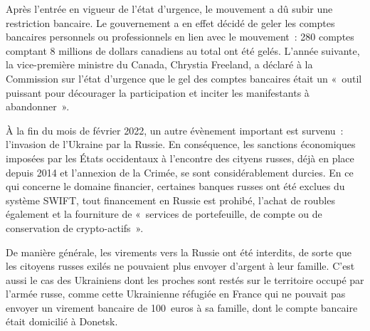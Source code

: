 Après l'entrée en vigueur de l'état d'urgence, le mouvement a dû subir une restriction bancaire. Le gouvernement a en effet décidé de geler les comptes bancaires personnels ou professionnels en lien avec le mouvement~: 280 comptes comptant 8 millions de dollars canadiens au total ont été gelés. L'année suivante, la vice-première ministre du Canada, Chrystia Freeland, a déclaré à la Commission sur l'état d'urgence que le gel des comptes bancaires était un «~outil puissant pour décourager la participation et inciter les manifestants à abandonner~».

À la fin du mois de février 2022, un autre évènement important est survenu~: l'invasion de l'Ukraine par la Russie. En conséquence, les sanctions économiques imposées par les États occidentaux à l'encontre des cityens russes, déjà en place depuis 2014 et l'annexion de la Crimée, se sont considérablement durcies. En ce qui concerne le domaine financier, certaines banques russes ont été exclues du système SWIFT, tout financement en Russie est prohibé, l'achat de roubles également et la fourniture de «~services de portefeuille, de compte ou de conservation de crypto-actifs~». %

De manière générale, les virements vers la Russie ont été interdits, de sorte que les citoyens russes exilés ne pouvaient plus envoyer d'argent à leur famille. C'est aussi le cas des Ukrainiens dont les proches sont restés sur le territoire occupé par l'armée russe, comme cette Ukrainienne réfugiée en France qui ne pouvait pas envoyer un virement bancaire de 100~euros à sa famille, dont le compte bancaire était domicilié à Donetsk.

